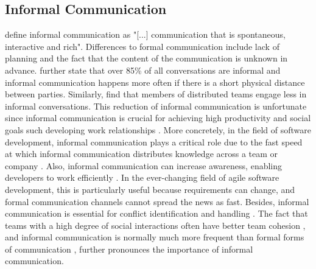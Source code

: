 

\subsection{Informal Communication}
\textcite{kraut1990informal} define informal communication as "[...] communication that is spontaneous, interactive and rich". Differences to formal communication include lack of planning and the fact that the content of the communication is unknown in advance. \textcite{kraut1990informal} further state that over 85\% of all conversations are informal and informal communication happens more often if there is a short physical distance between parties. Similarly, \textcite{hinds2005understanding} find that members of distributed teams engage less in informal conversations. This reduction of informal communication is unfortunate since informal communication is crucial for achieving high productivity and social goals \autocite{kraut1990informal} such developing work relationships \autocite{comella2020revisiting, olson2006bridging}. More concretely, in the field of software development, informal communication plays a critical role due to the fast speed at which informal communication distributes knowledge across a team or company \autocite{french1998study, mockus2001challenges}. Also, informal communication can increase awareness, enabling developers to work efficiently \autocite{herbsleb2001global}. In the ever-changing field of agile software development, this is particularly useful because requirements can change, and formal communication channels cannot spread the news as fast. Besides, informal communication is essential for conflict identification and handling \autocite{hinds2005understanding}. The fact that teams with a high degree of social interactions often have better team cohesion \autocite{staehle2014management}, and informal communication is normally much more frequent than formal forms of communication \autocite{kraut1990informal}, further pronounces the importance of informal communication.

